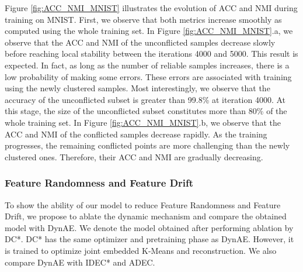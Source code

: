 \documentclass{article}
\begin{document}
Figure \ref{fig:ACC_NMI_MNIST} illustrates the evolution of ACC and NMI during training on MNIST. First, we observe that both metrics increase smoothly as computed using the whole training set. In Figure \ref{fig:ACC_NMI_MNIST}.a, we observe that the ACC and NMI of the unconflicted samples decrease slowly before reaching local stability between the iterations 4000 and 5000. This result is expected. In fact, as long as the number of reliable samples increases, there is a low probability of making some errors. These errors are associated with training using the newly clustered samples. Most interestingly, we observe that the accuracy of the unconflicted subset is greater than 99.8\% at iteration 4000. At this stage, the size of the unconflicted subset constitutes more than 80\% of the whole training set. In Figure \ref{fig:ACC_NMI_MNIST}.b, we observe that the ACC and NMI of the conflicted samples decrease rapidly.  As the training progresses, the remaining conflicted points are more challenging than the newly clustered ones. Therefore, their ACC and NMI are gradually decreasing.

\begin{figure*}[ht]
\vskip 0.2in
\centering
    \caption{ACC and NMI values during training on MNIST.}
\label{fig:ACC_NMI_MNIST}
\end{figure*}







\subsubsection{Feature Randomness and Feature Drift}
\label{Sec:Feature Randomness and Feature Drift}
To show the ability of our model to reduce Feature Randomness and Feature Drift, we propose to ablate the dynamic mechanism and compare the obtained model with DynAE. We denote the model obtained after performing ablation by DC*. DC* has the same optimizer and pretraining phase as DynAE. However, it is trained to optimize joint embedded K-Means and reconstruction. We also compare DynAE with IDEC* and ADEC.
\end{document}

